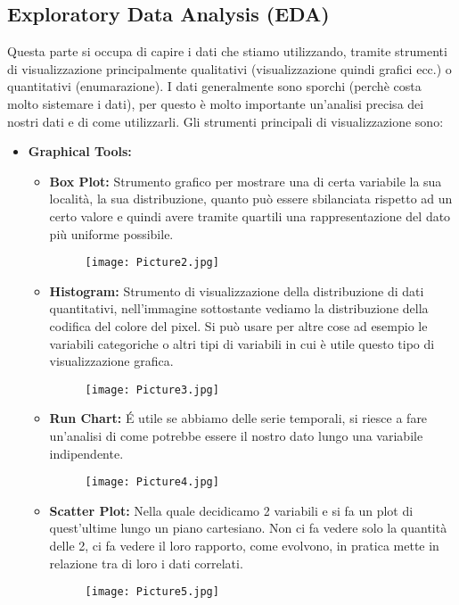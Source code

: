 \documentclass[a4paper,12pt]{article}
\begin{document}
\subsection{Exploratory Data Analysis (EDA)}
Questa parte si occupa di capire i dati che stiamo utilizzando, tramite strumenti di visualizzazione principalmente qualitativi (visualizzazione quindi grafici ecc.) o quantitativi (enumarazione).
I dati generalmente sono sporchi (perchè costa molto sistemare i dati), per questo è molto importante un'analisi precisa dei nostri dati e di come utilizzarli.
Gli strumenti principali di visualizzazione sono:
\begin{itemize}
    \item \textbf{Graphical Tools:}
    \begin{itemize}
        \item \textbf{Box Plot: }Strumento grafico per mostrare una di certa variabile la sua località, la sua distribuzione, quanto può essere sbilanciata rispetto ad un certo valore e quindi avere tramite quartili una rappresentazione del dato più uniforme possibile.
        \begin{figure}[H]
            \centering
            \texttt{[image: Picture2.jpg]}
            \label{etichetta27}
        \end{figure}
        \item \textbf{Histogram: }Strumento di visualizzazione della distribuzione di dati quantitativi, nell'immagine sottostante vediamo la distribuzione della codifica del colore del pixel. Si può usare per altre cose ad esempio le variabili categoriche o altri tipi di variabili in cui è utile questo tipo di visualizzazione grafica.
        \begin{figure}[H]
            \centering
            \texttt{[image: Picture3.jpg]}
            \label{etichetta28}
        \end{figure}
        \item \textbf{Run Chart: }\'{E} utile se abbiamo delle serie temporali, si riesce a fare un'analisi di come potrebbe essere il nostro dato lungo una variabile indipendente.
         \begin{figure}[H]
            \centering
            \texttt{[image: Picture4.jpg]}
            \label{etichetta29}
        \end{figure}   
        \item \textbf{Scatter Plot: }Nella quale decidicamo 2 variabili e si fa un plot di quest'ultime lungo un piano cartesiano. Non ci fa vedere solo la quantità delle 2, ci fa vedere il loro rapporto, come evolvono, in pratica mette in relazione tra di loro i dati correlati.
        \begin{figure}[H]
            \centering
            \texttt{[image: Picture5.jpg]}
            \label{etichetta30}
        \end{figure}
    \end{itemize}
\end{itemize}
\end{document}
